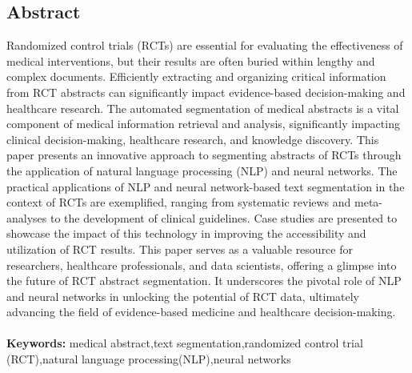 \documentclass[12pt,a4paper]{report}     %
\begin{document}
\newpage
		\newpage					%
		\pagestyle{plain}           %
		\begin{center}				%
			\begin{LARGE}
						\section*{ Abstract}
			\end{LARGE}
		\end{center}
		\begin{normalsize}
{\setlength{\baselineskip}{1.1\baselineskip}   %
\noindent %
Randomized control trials (RCTs) are essential for evaluating the effectiveness of medical interventions, but their results are often buried within lengthy and complex documents. Efficiently extracting and organizing critical information from RCT abstracts can significantly impact evidence-based decision-making and healthcare research. The automated segmentation of medical abstracts is a vital component of medical information retrieval and analysis, significantly impacting clinical decision-making, healthcare research, and knowledge discovery. This paper presents an innovative approach to segmenting abstracts of RCTs through the application of natural language processing (NLP) and neural networks. The practical applications of NLP and neural network-based text segmentation in the context of RCTs are exemplified, ranging from systematic reviews and meta-analyses to the development of clinical guidelines. Case studies are presented to showcase the impact of this technology in improving the accessibility and utilization of RCT results. This paper serves as a valuable resource for researchers, healthcare professionals, and data scientists, offering a glimpse into the future of RCT abstract segmentation. It underscores the pivotal role of NLP and neural networks in unlocking the potential of RCT data, ultimately advancing the field of evidence-based medicine and healthcare decision-making.\\\\ 
\textbf{Keywords:} %
medical abstract,text segmentation,randomized control trial (RCT),natural language processing(NLP),neural networks\\\\
\par}
		\end{normalsize}
\newpage
\end{document}
